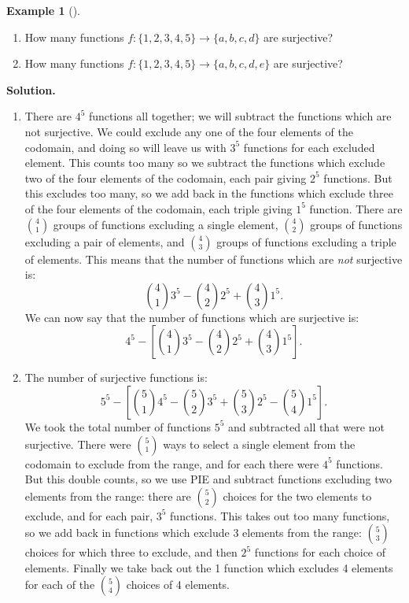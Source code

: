 \documentclass[10pt,]{book}
\theoremstyle{plain}
\theoremstyle{definition}
\newtheorem{example}[theorem]{Example}
\theoremstyle{definition}
\theoremstyle{definition}
\numberwithin{equation}{section}
\begin{document}
\begin{example}[]\label{example-54}
\leavevmode%
\begin{enumerate}
\item\hypertarget{li-635}{}
    How many functions \(f: \{1,2,3,4,5\} \to \{a,b,c,d\}\) are surjective?
\item\hypertarget{li-636}{}
    How many functions \(f: \{1,2,3,4,5\} \to \{a,b,c,d,e\}\) are surjective?
\end{enumerate}
\par\medskip\noindent%
\textbf{Solution.}\quad \leavevmode%
\begin{enumerate}
\item\hypertarget{li-637}{}
    There are \(4^5\) functions all together; we will subtract the functions which are not surjective.  We could exclude any one of the four elements of the codomain, and doing so will leave us with \(3^5\) functions for each excluded element.  This counts too many so we subtract the functions which exclude two of the four elements of the codomain, each pair giving \(2^5\) functions.  But this excludes too many, so we add back in the functions which exclude three of the four elements of the codomain, each triple giving \(1^5\) function.  There are \({4 \choose 1}\) groups of functions excluding a single element, \({4 \choose 2}\) groups of functions excluding a pair of elements, and \({4 \choose 3}\) groups of functions excluding a triple of elements.  This means that the number of functions which are \emph{not} surjective is:
    \begin{equation*}
      {4 \choose 1}3^5 - {4 \choose 2}2^5 + {4 \choose 3}1^5.
    \end{equation*}
    We can now say that the number of functions which are surjective is:
    \begin{equation*}
      4^5 - \left[{4 \choose 1}3^5 - {4 \choose 2}2^5 + {4 \choose 3}1^5\right].
    \end{equation*}
\item\hypertarget{li-638}{}
    The number of surjective functions is:
    \begin{equation*}
      5^5 - \left[{5 \choose 1}4^5 - {5 \choose 2}3^5 + {5 \choose 3}2^5 - {5 \choose 4}1^5\right].
    \end{equation*}
    We took the total number of functions \(5^5\) and subtracted all that were not surjective.  There were \({5 \choose 1}\) ways to select a single element from the codomain to exclude from the range, and for each there were \(4^5\) functions.  But this double counts, so we use PIE and subtract functions excluding two elements from the range: there are \({5 \choose 2}\) choices for the two elements to exclude, and for each pair, \(3^5\) functions.  This takes out too many functions, so we add back in functions which exclude 3 elements from the range: \({5 \choose 3}\) choices for which three to exclude, and then \(2^5\) functions for each choice of elements.  Finally we take back out the 1 function which excludes 4 elements for each of the \({5 \choose 4}\) choices of 4 elements.
\par


\end{enumerate}
\end{example}
\end{document}
